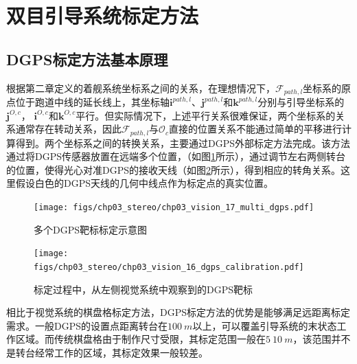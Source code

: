 \section{双目引导系统标定方法}
\subsection{DGPS标定方法基本原理}
根据第二章定义的着舰系统坐标系之间的关系，在理想情况下，$\mathcal{F}_{path,l}$坐标系的原点位于跑道中线的延长线上，其坐标轴$\mathbf{i}^{path,l}$、$\mathbf{j}^{path,l}$和$\mathbf{k}^{path,l}$分别与引导坐标系的$\mathbf{j}^{O,c}$， $\mathbf{i}^{O,c}$和$\mathbf{k}^{O,c}$平行。但实际情况下，上述平行关系很难保证，两个坐标系的关系通常存在转动关系，因此$\mathcal{F}_{path,l}$与$\mathcal{O}_c$直接的位置关系不能通过简单的平移进行计算得到。两个坐标系之间的转换关系，主要通过DGPS外部标定方法完成\cite{liao2009automatic}。该方法通过将DGPS传感器放置在远端多个位置，（如图\ref{fig:chp03_vision_17_multi_dgps}所示），通过调节左右两侧转台的位置，使得光心对准DGPS的接收天线（如图\ref{fig:chp03_vision_16_dgps_calibration}所示），得到相应的转角关系。这里假设白色的DGPS天线的几何中线点作为标定点的真实位置。

\begin{figure}[!th]
	\centering
	\texttt{[image: figs/chp03\_stereo/chp03\_vision\_17\_multi\_dgps.pdf]}	
	\caption{多个DGPS靶标标定示意图}
	\label{fig:chp03_vision_17_multi_dgps}
\end{figure}


\begin{figure}[htb]
	\centering
	\texttt{[image: figs/chp03\_stereo/chp03\_vision\_16\_dgps\_calibration.pdf]}	
	\caption{标定过程中，从左侧视觉系统中观察到的DGPS靶标}
	\label{fig:chp03_vision_16_dgps_calibration}
\end{figure}


相比于视觉系统的棋盘格标定方法，DGPS标定方法的优势是能够满足远距离标定需求。一般DGPS的设置点距离转台在$100\ m$以上，可以覆盖引导系统的末状态工作区域。而传统棋盘格由于制作尺寸受限，其标定范围一般在$5~10\ m$，该范围并不是转台经常工作的区域，其标定效果一般较差。

